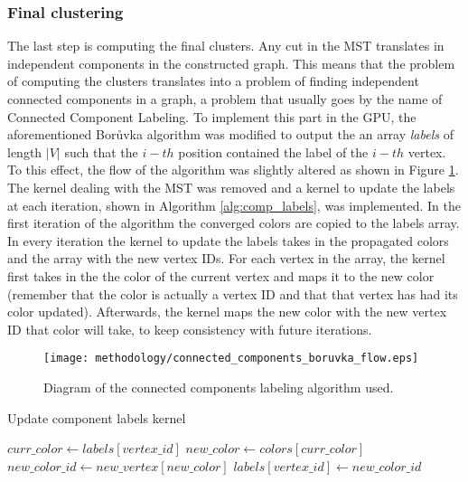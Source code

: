 \subsubsection{Final clustering}
The last step is computing the final clusters.
Any cut in the MST translates in independent components in the constructed graph.
This means that the problem of computing the clusters translates into a problem of finding independent connected components in a graph, a problem that usually goes by the name of Connected Component Labeling.
To implement this part in the GPU, the aforementioned Borůvka algorithm was modified to output the an array \emph{labels} of length $|V|$ such that the $i-th$ position contained the label of the $i-th$ vertex.
To this effect, the flow of the algorithm was slightly altered as shown in Figure \ref{fig:connected comps flow}. 
The kernel dealing with the MST was removed and a kernel to update the labels at each iteration, shown in Algorithm \ref{alg:comp_labels}, was implemented.
In the first iteration of the algorithm the converged colors are copied to the labels array.
In every iteration the kernel to update the labels takes in the propagated colors and the array with the new vertex IDs.
For each vertex in the array, the kernel first takes in the the color of the current vertex and maps it to the new color (remember that the color is actually a vertex ID and that that vertex has had its color updated).
Afterwards, the kernel maps the new color with the new vertex ID that color will take, to keep consistency with future iterations.

\begin{figure}[hbtp]
\centering
\texttt{[image: methodology/connected\_components\_boruvka\_flow.eps]}
\caption{Diagram of the connected components labeling algorithm used.}
\label{fig:connected comps flow}
\end{figure}


%
%


\begin{algorithm}
\caption{Update component labels kernel}\label{alg:comp_labels}
\begin{algorithmic}[1]
\State $curr\_color \gets labels[vertex\_id]$
\State $new\_color \gets colors[curr\_color]$
\State $new\_color\_id \gets new\_vertex[new\_color]$
\State $labels[vertex\_id] \gets new\_color\_id$
\EndProcedure
\end{algorithmic}
\end{algorithm}



